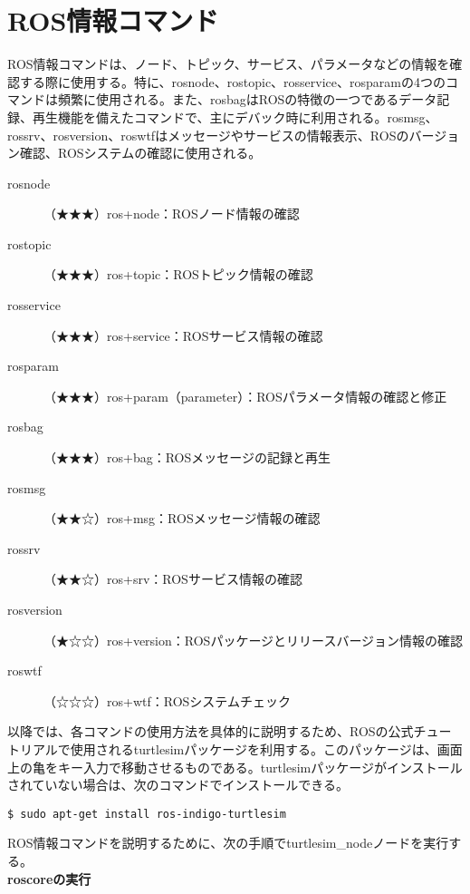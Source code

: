 \section{ROS情報コマンド}
\label{section:infocommand}

ROS情報コマンドは、ノード、トピック、サービス、パラメータなどの情報を確認する際に使用する。特に、rosnode、rostopic、rosservice、rosparamの4つのコマンドは頻繁に使用される。また、rosbagはROSの特徴の一つであるデータ記録、再生機能を備えたコマンドで、主にデバック時に利用される。rosmsg、rossrv、rosversion、roswtfはメッセージやサービスの情報表示、ROSのバージョン確認、ROSシステムの確認に使用される。

\vspace{\baselineskip}
\noindent
\begin{description}
\item[rosnode]（★★★）ros+node：ROSノード情報の確認
\item[rostopic]（★★★）ros+topic：ROSトピック情報の確認
\item[rosservice]（★★★）ros+service：ROSサービス情報の確認
\item[rosparam] （★★★）ros+param（parameter）：ROSパラメータ情報の確認と修正
\item[rosbag]（★★★）ros+bag：ROSメッセージの記録と再生
\item[rosmsg]（★★☆）ros+msg：ROSメッセージ情報の確認
\item[rossrv] （★★☆）ros+srv：ROSサービス情報の確認
\item[rosversion]（★☆☆）ros+version：ROSパッケージとリリースバージョン情報の確認
\item[roswtf]（☆☆☆）ros+wtf：ROSシステムチェック
\end{description}
\vspace{\baselineskip}

以降では、各コマンドの使用方法を具体的に説明するため、ROSの公式チュートリアルで使用されるturtlesimパッケージを利用する。このパッケージは、画面上の亀をキー入力で移動させるものである。turtlesimパッケージがインストールされていない場合は、次のコマンドでインストールできる。

\begin{lstlisting}[language=ROS]
$ sudo apt-get install ros-indigo-turtlesim
\end{lstlisting}

ROS情報コマンドを説明するために、次の手順でturtlesim\_nodeノードを実行する。\\

\textbf{roscoreの実行}

